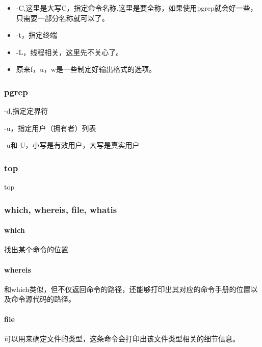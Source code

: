 \begin{itemize}
\item -C,这里是大写C，指定命令名称.这里是要全称，如果使用pgrep就会好一些，只需要一部分名称就可以了。


\item -t，指定终端

\item -L，线程相关，这里先不关心了。

\item 原来f，u，w是一些制定好输出格式的选项。





\end{itemize}

\subsubsection{pgrep}

-d,指定定界符

-u，指定用户（拥有者）列表

-u和-U，小写是有效用户，大写是真实用户




\subsubsection{top}

top

\subsubsection{which, whereis, file, whatis}

\paragraph{which} 找出某个命令的位置

\paragraph{whereis} 和which类似，但不仅返回命令的路径，还能够打印出其对应的命令手册的位置以及命令源代码的路径。

\paragraph{file} 可以用来确定文件的类型，这条命令会打印出该文件类型相关的细节信息。




